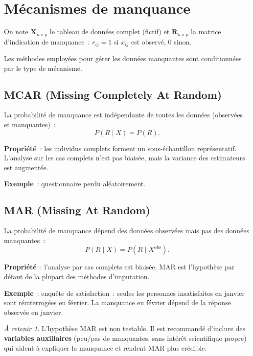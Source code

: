 \documentclass[a4paper,11pt]{article}
\theoremstyle{definition}
\theoremstyle{remark}
\newtheorem*{important}{À retenir}
\begin{document}
\section{Mécanismes de manquance}

On note $\mathbf{X}_{n\times p}$ le tableau de données complet (fictif)
et $\mathbf{R}_{n\times p}$ la matrice d'indication de manquance~:
$r_{ij} = 1$ si $x_{ij}$ est observé, $0$ sinon.

Les méthodes employées pour gérer les données manquantes sont conditionnées
par le type de mécanisme.

\subsection{MCAR (Missing Completely At Random)}

La probabilité de manquance est indépendante de toutes les données
(observées et manquantes)~:
\[
P(R \mid X) = P(R).
\]

\textbf{Propriété}~: les individus complets forment un sous-échantillon
représentatif. L'analyse sur les cas complets n'est pas biaisée, mais
la variance des estimateurs est augmentée.

\textbf{Exemple}~: questionnaire perdu aléatoirement.

\subsection{MAR (Missing At Random)}

La probabilité de manquance dépend des données observées mais pas des
données manquantes~:
\[
P(R \mid X) = P(R \mid X^{\text{obs}}).
\]

\textbf{Propriété}~: l'analyse par cas complets est biaisée. MAR est
l'hypothèse par défaut de la plupart des méthodes d'imputation.

\textbf{Exemple}~: enquête de satisfaction~: seules les personnes
insatisfaites en janvier sont réinterrogées en février. La manquance
en février dépend de la réponse observée en janvier.

\begin{important}
  L'hypothèse MAR est non testable. Il est recommandé d'inclure des
  \textbf{variables auxiliaires} (peu/pas de manquantes, sans intérêt
  scientifique propre) qui aident à expliquer la manquance et rendent
  MAR plus crédible.
\end{important}
\end{document}
